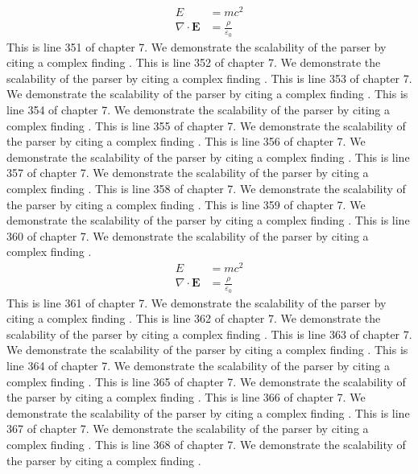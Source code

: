 \begin{align*}
  E &= mc^2 \\
  \nabla \cdot \mathbf{E} &= \frac{\rho}{\varepsilon_0}
\end{align*}
This is line 351 of chapter 7. We demonstrate the scalability of the parser by citing a complex finding \cite{ref7_351}.
This is line 352 of chapter 7. We demonstrate the scalability of the parser by citing a complex finding \cite{ref7_352}.
This is line 353 of chapter 7. We demonstrate the scalability of the parser by citing a complex finding \cite{ref7_353}.
This is line 354 of chapter 7. We demonstrate the scalability of the parser by citing a complex finding \cite{ref7_354}.
This is line 355 of chapter 7. We demonstrate the scalability of the parser by citing a complex finding \cite{ref7_355}.
This is line 356 of chapter 7. We demonstrate the scalability of the parser by citing a complex finding \cite{ref7_356}.
This is line 357 of chapter 7. We demonstrate the scalability of the parser by citing a complex finding \cite{ref7_357}.
This is line 358 of chapter 7. We demonstrate the scalability of the parser by citing a complex finding \cite{ref7_358}.
This is line 359 of chapter 7. We demonstrate the scalability of the parser by citing a complex finding \cite{ref7_359}.
This is line 360 of chapter 7. We demonstrate the scalability of the parser by citing a complex finding \cite{ref7_360}.
\begin{align*}
  E &= mc^2 \\
  \nabla \cdot \mathbf{E} &= \frac{\rho}{\varepsilon_0}
\end{align*}
This is line 361 of chapter 7. We demonstrate the scalability of the parser by citing a complex finding \cite{ref7_361}.
This is line 362 of chapter 7. We demonstrate the scalability of the parser by citing a complex finding \cite{ref7_362}.
This is line 363 of chapter 7. We demonstrate the scalability of the parser by citing a complex finding \cite{ref7_363}.
This is line 364 of chapter 7. We demonstrate the scalability of the parser by citing a complex finding \cite{ref7_364}.
This is line 365 of chapter 7. We demonstrate the scalability of the parser by citing a complex finding \cite{ref7_365}.
This is line 366 of chapter 7. We demonstrate the scalability of the parser by citing a complex finding \cite{ref7_366}.
This is line 367 of chapter 7. We demonstrate the scalability of the parser by citing a complex finding \cite{ref7_367}.
This is line 368 of chapter 7. We demonstrate the scalability of the parser by citing a complex finding \cite{ref7_368}.
